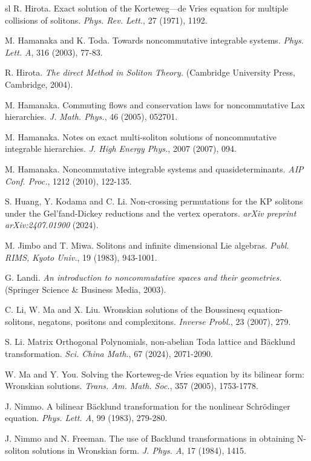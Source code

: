 \documentclass[11p,reqno]{amsart}
\numberwithin{equation}{section}
\numberwithin{equation}{section}
\begin{document}
\begin{thebibliography}{sl}
R. Hirota. 
Exact solution of the Korteweg—de Vries equation for multiple collisions of solitons. \emph{Phys. Rev. Lett.}, 27 (1971), 1192.

M. Hamanaka and K. Toda. 
Towards noncommutative integrable systems. 
\emph{Phys. Lett. A}, 316 (2003), 77-83. 

R. Hirota. 
\emph{The direct Method in Soliton Theory.} 
(Cambridge University Press, Cambridge, 2004).

M. Hamanaka. 
Commuting flows and conservation laws for noncommutative Lax hierarchies. 
\emph{J. Math. Phys.}, 46 (2005), 052701.

M. Hamanaka. 
Notes on exact multi-soliton solutions of noncommutative integrable hierarchies. 
\emph{J. High Energy Phys.}, 2007 (2007), 094. 

M. Hamanaka. 
Noncommutative integrable systems and quasideterminants. 
\emph{AIP Conf. Proc.}, 1212 (2010), 122-135.

S. Huang, Y. Kodama and C. Li. 
Non-crossing permutations for the KP solitons under the Gel'fand-Dickey reductions and the vertex operators.
\emph{arXiv preprint arXiv:2407.01900} (2024).


M. Jimbo and T. Miwa.
Solitons and infinite dimensional Lie algebras.
\emph{Publ. RIMS, Kyoto Univ.}, 19 (1983), 943-1001.

G. Landi. 
\emph{An introduction to noncommutative spaces and their geometries.} 
(Springer Science \& Business Media, 2003).

C. Li, W. Ma and X. Liu. 
Wronskian solutions of the Boussinesq equation-solitons, negatons, positons and complexitons. 
\emph{Inverse Probl.}, 23 (2007), 279.

S. Li.
Matrix Orthogonal Polynomials, non-abelian Toda lattice and Bäcklund transformation.
\emph{Sci. China Math.}, 67 (2024), 2071-2090.

W. Ma and Y. You. 
Solving the Korteweg-de Vries equation by its bilinear form: Wronskian solutions.
\emph{Trans. Am. Math. Soc.}, 357 (2005), 1753-1778.

J. Nimmo. 
A bilinear B\"acklund transformation for the nonlinear Schr\"odinger equation.
\emph{Phys. Lett. A}, 99 (1983), 279-280.

J. Nimmo and N. Freeman.
The use of Backlund transformations in obtaining N-soliton solutions in Wronskian form.
\emph{J. Phys. A}, 17 (1984), 1415.


\end{thebibliography}
\end{document}
